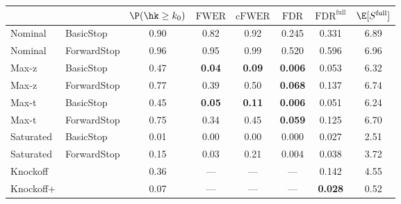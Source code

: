 
\newcommand{\guarantee}[1]{{\bf #1}}
{\small 
\begin{tabular}{|l l|cccccc|}
\hline
{} & {} &  $\P(\hk \geq k_0)$ &  $\text{FWER}$ &  $\text{cFWER}$ &  $\text{FDR}$ &  $\text{FDR}^{\text{full}}$ &  $\E[S^{\text{full}}]$ \\ \hline
Nominal & BasicStop & 0.90 & 0.82 & 0.92 & 0.245 & 0.331 & 6.89 \\ 
Nominal & ForwardStop & 0.96 & 0.95 & 0.99 & 0.520 & 0.596 & 6.96 \\ 
Max-z & BasicStop & 0.47 & \guarantee{0.04} & \guarantee{0.09} & \guarantee{0.006} & 0.053 & 6.32 \\ 
Max-z & ForwardStop & 0.77 & 0.39 & 0.50 & \guarantee{0.068} & 0.137 & 6.74 \\ 
Max-t & BasicStop & 0.45 & \guarantee{0.05} & \guarantee{0.11} & \guarantee{0.006} & 0.051 & 6.24 \\ 
Max-t & ForwardStop & 0.75 & 0.34 & 0.45 & \guarantee{0.059} & 0.125 & 6.70 \\ 
Saturated & BasicStop & 0.01 & 0.00 & 0.00 & 0.000 & 0.027 & 2.51 \\ 
Saturated & ForwardStop & 0.15 & 0.03 & 0.21 & 0.004 & 0.038 & 3.72 \\ 
Knockoff & & 0.36 & --- & --- & --- & 0.142 & 4.55 \\ 
Knockoff+ & & 0.07 & --- & --- & --- & \guarantee{0.028} & 0.52 \\  \hline
\end{tabular}}